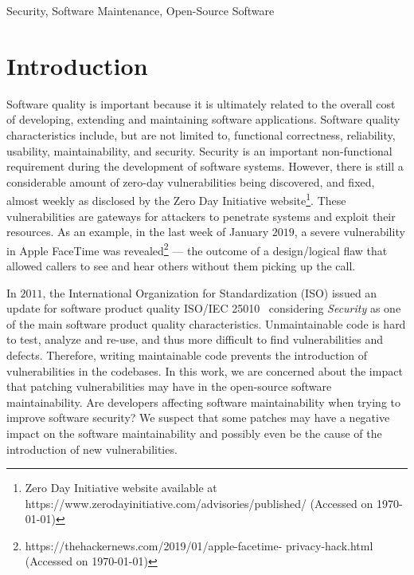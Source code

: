 \documentclass[10pt,conference]{IEEEtran}
\begin{document}
\begin{IEEEkeywords}
Security, Software Maintenance, Open-Source Software
\end{IEEEkeywords}

\section{Introduction}

Software quality is important because it is ultimately related to the overall
cost of developing, extending and maintaining software applications. Software
quality characteristics include, but are not limited to, functional correctness,
reliability, usability, maintainability, and security. Security is an important
non-functional requirement during the development of software systems.  However,
there is still a considerable amount of zero-day vulnerabilities being
discovered, and fixed, almost weekly as disclosed by the Zero Day Initiative
website\footnote{Zero Day Initiative website available at
https://www.zerodayinitiative.com/advisories/published/ (Accessed on \today{})}.
These vulnerabilities are gateways for attackers to penetrate
systems and exploit their resources.
As an example, in the last week of January $2019$, a severe vulnerability in Apple
FaceTime was revealed\footnote{https://thehackernews.com/2019/01/apple-facetime-
privacy-hack.html (Accessed on \today{})} --- the outcome of a design/logical
flaw that allowed callers to see and hear others without them picking up the call.

In $2011$, the International Organization for Standardization (ISO) issued an
update for software product quality ISO/IEC 25010~\cite{iso:2011} considering
\emph{Security} as one of the main software product quality characteristics.
Unmaintainable code is hard to test, analyze and re-use, and thus more difficult
to find vulnerabilities and defects. Therefore, writing maintainable code
prevents the introduction of vulnerabilities in the codebases. In this work, we
are concerned about the impact that patching vulnerabilities may have in the
open-source software maintainability. Are developers affecting software
maintainability when trying to improve software security? We suspect that some
patches may have a negative impact on the software maintainability and
possibly even be the cause of the introduction of new vulnerabilities.
\end{document}
